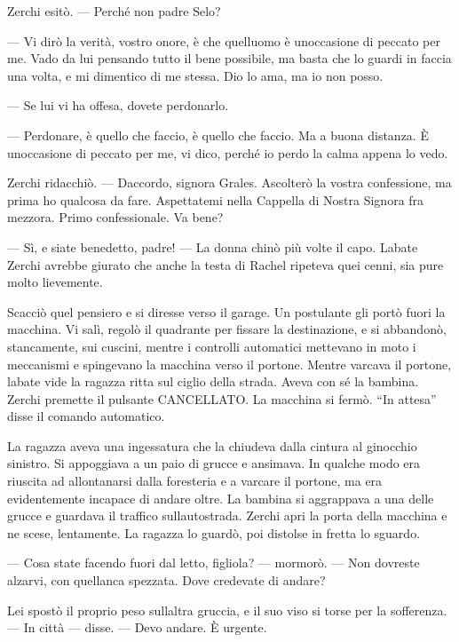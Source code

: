 Zerchi esitò. --- Perché non padre Selo?

--- Vi dirò la verità, vostro onore, è che quell\textquotesingle uomo è
un\textquotesingle occasione di peccato per me. Vado da lui pensando
tutto il bene possibile, ma basta che lo guardi in faccia una volta, e
mi dimentico di me stessa. Dio lo ama, ma io non posso.

--- Se lui vi ha offesa, dovete perdonarlo.

--- Perdonare, è quello che faccio, è quello che faccio. Ma a buona
distanza. È un\textquotesingle occasione di peccato per me, vi dico,
perché io perdo la calma appena lo vedo.

Zerchi ridacchiò. --- D\textquotesingle accordo, signora Grales.
Ascolterò la vostra confessione, ma prima ho qualcosa da fare.
Aspettatemi nella Cappella di Nostra Signora fra
mezz\textquotesingle ora. Primo confessionale. Va bene?

--- Sì, e siate benedetto, padre! --- La donna chinò più volte il capo.
L\textquotesingle abate Zerchi avrebbe giurato che anche la testa di
Rachel ripeteva quei cenni, sia pure molto lievemente.

Scacciò quel pensiero e si diresse verso il garage. Un postulante gli
portò fuori la macchina. Vi salì, regolò il quadrante per fissare la
destinazione, e si abbandonò, stancamente, sui cuscini, mentre i
controlli automatici mettevano in moto i meccanismi e spingevano la
macchina verso il portone. Mentre varcava il portone,
l\textquotesingle abate vide la ragazza ritta sul ciglio della strada.
Aveva con sé la bambina. Zerchi premette il pulsante CANCELLATO. La
macchina si fermò. ``In attesa'' disse il comando automatico.

La ragazza aveva una ingessatura che la chiudeva dalla cintura al
ginocchio sinistro. Si appoggiava a un paio di grucce e ansimava. In
qualche modo era riuscita ad allontanarsi dalla foresteria e a varcare
il portone, ma era evidentemente incapace di andare oltre. La bambina si
aggrappava a una delle grucce e guardava il traffico
sull\textquotesingle autostrada. Zerchi apri la porta della macchina e
ne scese, lentamente. La ragazza lo guardò, poi distolse in fretta lo
sguardo.

--- Cosa state facendo fuori dal letto, figliola? --- mormorò. --- Non
dovreste alzarvi, con quell\textquotesingle anca spezzata. Dove
credevate di andare?

Lei spostò il proprio peso sull\textquotesingle altra gruccia, e il suo
viso si torse per la sofferenza. --- In città --- disse. --- Devo
andare. È urgente.

